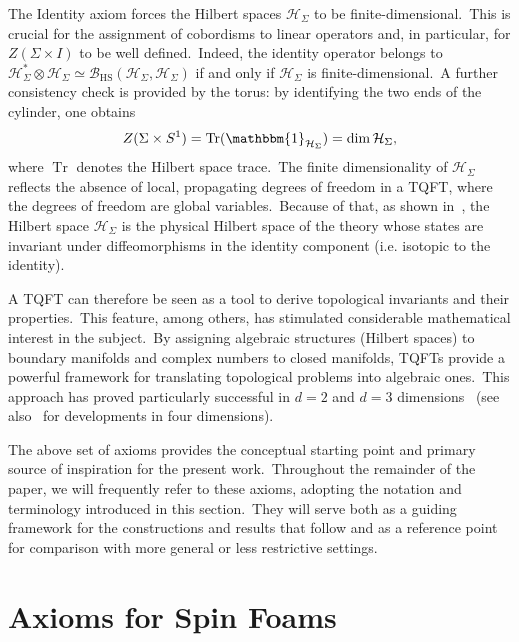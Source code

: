 \documentclass[11pt]{article}
\theoremstyle{definition}
\numberwithin{equation}{section}
\begin{document}
The Identity axiom forces the Hilbert spaces $\mathcal{H}_{\Sigma}$ to be finite-dimensional.~This is crucial for the assignment of cobordisms to linear operators and, in particular, for $Z(\Sigma \times I)$ to be well defined.~Indeed, the identity operator belongs to $\mathcal{H}_{\Sigma}^* \otimes \mathcal{H}_{\Sigma} \simeq \mathcal{B}_{\mathrm{HS}}(\mathcal{H}_{\Sigma},\mathcal{H}_{\Sigma})$ if and only if $\mathcal{H}_{\Sigma}$ is finite-dimensional.~A further consistency check is provided by the torus: by identifying the two ends of the cylinder, one obtains
\[
Z(\Sigma \times S^1) = \operatorname{Tr}(\mathbbm{1}_{\mathcal{H}_{\Sigma}}) = \dim \mathcal{H}_{\Sigma},
\]
where $\operatorname{Tr}$ denotes the Hilbert space trace.~The finite dimensionality of $\mathcal{H}_{\Sigma}$ reflects the absence of local, propagating degrees of freedom in a TQFT, where the degrees of freedom are global variables.~Because of that, as shown in~\cite{Atiyah_1988,Bakalov_Kirillov_2001}, the Hilbert space $\mathcal{H}_\Sigma$  is the physical Hilbert space of the theory whose states are invariant under diffeomorphisms in the identity component (i.e. isotopic to the identity).

A TQFT can therefore be seen as a tool to derive topological invariants and their properties.~This feature, among others, has stimulated considerable mathematical interest in the subject.~By assigning algebraic structures (Hilbert spaces) to boundary manifolds and complex numbers to closed manifolds, TQFTs provide a powerful framework for translating topological problems into algebraic ones.~This approach has proved particularly successful in $d=2$ and $d=3$ dimensions~\cite{Abrams:1996ty,Kock_2004,Reshetikhin:1991tc,Witten_1989,Turaev_book} (see also~\cite{Barenz:2016nzn,Meusburger_2025} for developments in four dimensions).

The above set of axioms provides the conceptual starting point and primary source of inspiration for the present work.~Throughout the remainder of the paper, we will frequently refer to these axioms, adopting the notation and terminology introduced in this section.~They will serve both as a guiding framework for the constructions and results that follow and as a reference point for comparison with more general or less restrictive settings.

\section{Axioms for Spin Foams}\label{Sec:SFQG}
\end{document}

